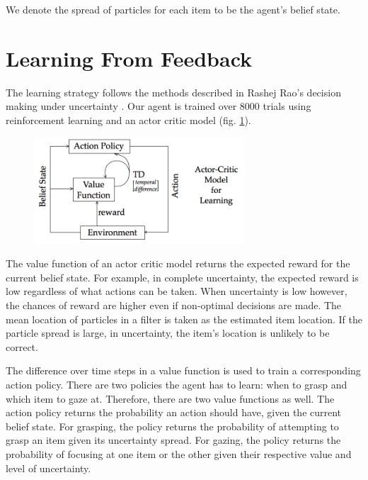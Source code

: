\documentclass[11]{article}
\begin{document}
We denote the spread of particles for each item to be the agent's belief state. 

\section{Learning From Feedback}
The learning strategy follows the methods described in Rashej Rao's decision making under uncertainty \cite{rashejrao}.
Our agent is trained over 8000 trials using reinforcement learning and an actor critic model (fig. \ref{fig:actor-critic}). 
\begin{figure}[h]
	\centering
	\includegraphics[width=0.7\textwidth]{figures/actorcritic.png}
	\caption{}
	\label{fig:actor-critic}
\end{figure} 

The value function of an actor critic model returns the expected reward for the current belief state.
For example, in complete uncertainty, the expected reward is low regardless of what actions can be taken.
When uncertainty is low however, the chances of reward are higher even if non-optimal decisions are made.  
The mean location of particles in a filter is taken as the estimated item location.
If the particle spread is large, in uncertainty, the item's location is unlikely to be correct. 

The difference over time steps in a value function is used to train a corresponding action policy.
There are two policies the agent has to learn: when to grasp and which item to gaze at.
Therefore, there are two value functions as well. 
The action policy returns the probability an action should have, given the current belief state.
For grasping, the policy returns the probability of attempting to grasp an item given its uncertainty spread.
For gazing, the policy returns the probability of focusing at one item or the other given their respective value and level of uncertainty.
\end{document}
